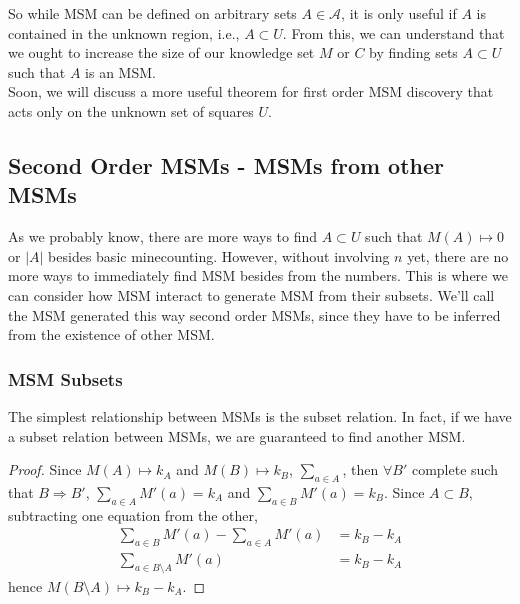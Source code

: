 So while MSM can be defined on arbitrary sets $A\in\mathcal{A}$, it is only useful if $A$ is contained in the unknown region, i.e., $A\subset U$. From this, we can understand that we ought to increase the size of our knowledge set $M$ or $C$ by finding sets $A\subset U$ such that $A$ is an MSM.\\

Soon, we will discuss a more useful theorem for first order MSM discovery that acts only on the unknown set of squares $U$.\\

\subsection{Second Order MSMs - MSMs from other MSMs}

As we probably know, there are more ways to find $A\subset U$ such that $M(A)\mapsto0$ or $|A|$ besides basic minecounting. However, without involving $n$ yet, there are no more ways to immediately find MSM besides from the numbers. This is where we can consider how MSM interact to generate MSM from their subsets. We'll call the MSM generated this way second order MSMs, since they have to be inferred from the existence of other MSM.\\

\subsubsection*{MSM Subsets}

The simplest relationship between MSMs is the subset relation. In fact, if we have a subset relation between MSMs, we are guaranteed to find another MSM.

\begin{proof}
    Since $M(A)\mapsto k_A$ and $M(B)\mapsto k_B$, $\sum_{a\in A}$, then $\forall B'$ complete such that $B\Rightarrow B'$, $\sum_{a\in A}M'(a)=k_A$ and $\sum_{a\in B}M'(a)=k_B$. Since $A\subset B$, subtracting one equation from the other,\begin{align*}
        \sum_{a\in B}M'(a)-\sum_{a\in A}M'(a)&=k_B-k_A\\
        \sum_{a\in B\setminus A}M'(a)&=k_B-k_A
    \end{align*}
    hence $M(B\setminus A)\mapsto k_B-k_A$.
\end{proof}

